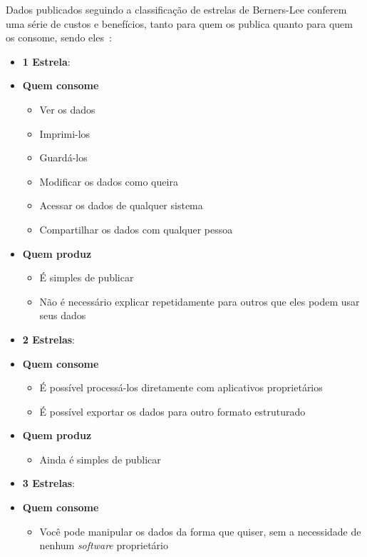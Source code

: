 Dados publicados seguindo a classificação de estrelas de Berners-Lee conferem uma série de custos e benefícios, tanto para quem os publica quanto para quem os consome, sendo eles~\cite{seijiconectados}:
\begin{itemize} 
\item \textbf{1 Estrela}: 
	\item[] \textbf{Quem consome}
		\begin{itemize}
			\itemsep0em
			\item Ver os dados
			\item Imprimi-los
			\item Guardá-los
			\item Modificar os dados como queira
			\item Acessar os dados de qualquer sistema
			\item Compartilhar os dados com qualquer pessoa			
		\end{itemize}
		
	\item[] \textbf{Quem produz}
		\begin{itemize}
			\itemsep0em
			\item É simples de publicar
			\item Não é necessário explicar repetidamente para outros que eles podem usar seus dados
		\end{itemize}
		
\item \textbf{2 Estrelas}:

	\item[] \textbf{Quem consome}
		\begin{itemize}
			\itemsep0em
			\item É possível processá-los diretamente com aplicativos proprietários 
			\item É possível exportar os dados para outro formato estruturado
		\end{itemize}
		
	\item[] \textbf{Quem produz}
		\begin{itemize}
			\itemsep0em
			\item Ainda é simples de publicar
		\end{itemize}

\item \textbf{3 Estrelas}:
	\item[] \textbf{Quem consome}
		\begin{itemize}
			\itemsep0em
			\item Você pode manipular os dados da forma que quiser, sem a necessidade de nenhum \emph{software} proprietário	
		\end{itemize}
		

\end{itemize}

